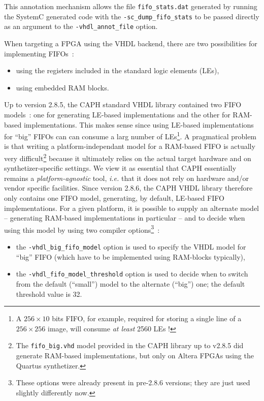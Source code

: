 This annotation mechanism allows the file \verb|fifo_stats.dat| generated by running the SystemC generated code with the
\verb|-sc_dump_fifo_stats| to be passed directly as an argument to the \verb|-vhdl_annot_file|
option. 

\medskip
When targeting a FPGA using the VHDL backend, there are two possibilities for implementing FIFOs~:
\begin{itemize}
\item using the registers included in the standard logic elements (LEs),
\item using embedded RAM blocks.
\end{itemize}
Up to version 2.8.5, the CAPH standard VHDL library contained two FIFO models~: one for generating
LE-based implementations and the other for RAM-based implementations.  This makes sense since using
LE-based implementations for ``big'' FIFOs can can consume a larg number of LEs\footnote{A
  $256 \times 10$ bits FIFO, for example, required for storing a single line of a $256 \times 256$
  image, will consume \emph{at least} 2560 LEs !}.  A pragmatical problem is that writing a
platform-independant model for a RAM-based FIFO is actually very difficult\footnote{The
  \texttt{fifo\_big.vhd} model provided in the CAPH library up to v2.8.5 did generate RAM-based
  implementations, but only on Altera FPGAs using the Quartus synthetizer.} because it ultimately
relies on the actual target hardware and on synthetizer-specific settings.  We view it as essential
that CAPH essentially remains a \emph{platform-agnostic} tool, \emph{i.e.} that it does not rely on
hardware and/or vendor specific facilities. Since version 2.8.6, the CAPH VHDL library therefore
only contains one FIFO model, generating, by default, LE-based FIFO implementations. For a given
platform, it is possible to supply an alternate model -- generating RAM-based implementations in
particular -- and to decide when using this model by using two compiler options\footnote{These options were
  already present in pre-2.8.6 versions; they are just used slightly differently now.}~:
\begin{itemize}
\item the \verb|-vhdl_big_fifo_model| option is used to specify the VHDL model for ``big'' FIFO
  (which have to be implemented using RAM-blocks typically),
\item the \verb|-vhdl_fifo_model_threshold| option is used to decide when to switch from the default
  (``small'') model to the alternate (``big'') one; the default threshold value is 32. 
\end{itemize}
